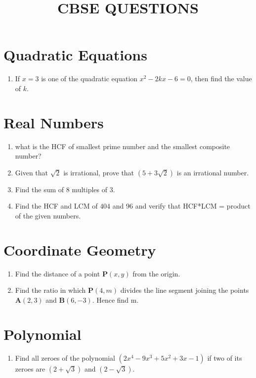 \documentclass{article}
\let\vec\mathbf
\providecommand{\brak}[1]{\ensuremath{\left(#1\right)}}
\begin{document}
\title{\textbf{CBSE QUESTIONS}}
\date{}
\maketitle{}
		\section{Quadratic Equations}
		\begin{enumerate}[label=(\roman*)]
\item If $x=3$ is one of the quadratic equation $x^2-2kx-6= 0$, then find the value of $k$.
		\end{enumerate}
	\section{Real Numbers}
		\begin{enumerate}[label=(\roman*)]
	\item what is the HCF of smallest prime number and the smallest composite number?
	\item Given that $\sqrt{2}$ is irrational, prove that $\brak{5+3\sqrt2}$ is an irrational number.
	\item Find the sum of $8$ multiples of $3$.
	\item Find the HCF and LCM of $404$ and $96$ and verify that HCF*LCM = product of the given numbers.
		\end{enumerate}
		\section{Coordinate Geometry}
		\begin{enumerate}[label=(\roman*)]
			\item Find the distance of a point $\vec{P}(x,y)$ from the origin.
			\item Find the ratio in which $\vec{P}(4,m)$ divides the line segment joining the points $\vec{A}(2,3)$ and $\vec{B}(6,-3)$. Hence find m.
		\end{enumerate}
		\section{Polynomial}
		\begin{enumerate}[label=(\roman*)]
			\item Find all zeroes of the polynomial $\brak{2x^4-9x^3+5x^2+3x-1}$ if two of its zeroes are $\brak{2+\sqrt3}$ and $\brak{2-\sqrt3}$.
		\end{enumerate}
\end{document}
